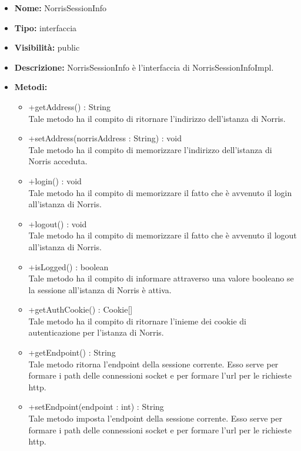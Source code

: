 			
			\begin{itemize}
			\item \textbf{Nome:} NorrisSessionInfo
			\item \textbf{Tipo:} interfaccia
			
			\item \textbf{Visibilità:} public
			\item \textbf{Descrizione:} NorrisSessionInfo è l'interfaccia di NorrisSessionInfoImpl.
			\item \textbf{Metodi:}
				\begin{itemize}
				\setlength{\itemsep}{5pt}
				
					\item[\ding{111}] {{+getAddress() : String}} \\ [1mm] Tale metodo ha il compito di ritornare l'indirizzo dell'istanza di Norris.
					\item[\ding{111}] {{+setAddress(norrisAddress : String) : void}} \\ [1mm] Tale metodo ha il compito di memorizzare l'indirizzo dell'istanza di Norris acceduta.
					\item[\ding{111}] {{+login() : void}} \\ [1mm] Tale metodo ha il compito di memorizzare il fatto che è avvenuto il login all'istanza di Norris.
					\item[\ding{111}] {{+logout() : void}} \\ [1mm] Tale metodo ha il compito di memorizzare il fatto che è avvenuto il logout all'istanza di Norris.
					\item[\ding{111}] {{+isLogged() : boolean}} \\ [1mm] Tale metodo ha il compito di informare attraverso una valore booleano se la sessione all'istanza di Norris è attiva.
					\item[\ding{111}] {{+getAuthCookie() : Cookie[]}} \\ [1mm] Tale metodo ha il compito di ritornare l'inieme dei cookie di autenticazione per l'istanza di Norris.
					\item[\ding{111}] {{+getEndpoint() : String}} \\ [1mm] Tale metodo ritorna l'endpoint della sessione corrente. Esso serve per formare i path delle connessioni socket e per formare l'url per le richieste http.
					\item[\ding{111}] {{+setEndpoint(endpoint : int) : String}} \\ [1mm] Tale metodo imposta l'endpoint della sessione corrente. Esso serve per formare i path delle connessioni socket e per formare l'url per le richieste http.
				\end{itemize}
		
			\end{itemize}

